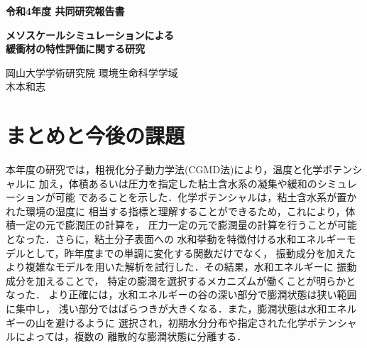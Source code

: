 ﻿\documentclass[11pt,a4j]{jarticle}
\newlength{\minitwocolumn}
\begin{document}
\newcommand{\fat}[1]{\mbox{\boldmath $#1$}}
\newcommand{\D}{\partial}
\newcommand{\w}{\omega}
\newcommand{\ga}{\alpha}
\newcommand{\gb}{\beta}
\newcommand{\gx}{\xi}
\newcommand{\gz}{\zeta}
\newcommand{\vhat}[1]{\hat{\fat{#1}}}
\newcommand{\spc}{\vspace{0.7\baselineskip}}
\newcommand{\halfspc}{\vspace{0.3\baselineskip}}

\newcommand{\twofig}[2]
 {
   \begin{figure}[h]
     \begin{minipage}[t]{\minitwocolumn}
         \begin{center}   #1
         \end{center}
     \end{minipage}
         \hspace{\columnsep}
     \begin{minipage}[t]{\minitwocolumn}
         \begin{center} #2
         \end{center}
     \end{minipage}
   \end{figure}
 }
\begin{center}
{\Large \bf 令和4年度 共同研究報告書}
\end{center}
\vspace{2mm}
\begin{center}
{\LARGE \bf 
メソスケールシミュレーションによる\\緩衝材の特性評価に関する研究} 
\end{center}
\begin{center}
岡山大学学術研究院 環境生命科学学域\\
木本和志
\end{center}
\vspace{10mm}
	

%
\section{まとめと今後の課題}
本年度の研究では，粗視化分子動力学法(CGMD法)により，温度と化学ポテンシャルに
加え，体積あるいは圧力を指定した粘土含水系の凝集や緩和のシミュレーションが可能
であることを示した．化学ポテンシャルは，粘土含水系が置かれた環境の湿度に
相当する指標と理解することができるため，これにより，体積一定の元で膨潤圧の計算を，
圧力一定の元で膨潤量の計算を行うことが可能となった．さらに，粘土分子表面への
水和挙動を特徴付ける水和エネルギーモデルとして，昨年度までの単調に変化する関数だけでなく，
振動成分を加えたより複雑なモデルを用いた解析を試行した．その結果，水和エネルギーに
振動成分を加えることで， 特定の膨潤を選択するメカニズムが働くことが明らかとなった．
より正確には，水和エネルギーの谷の深い部分で膨潤状態は狭い範囲に集中し，
浅い部分ではばらつきが大きくなる．また，膨潤状態は水和エネルギーの山を避けるように
選択され，初期水分分布や指定された化学ポテンシャルによっては，複数の
離散的な膨潤状態に分離する．
\end{document}
